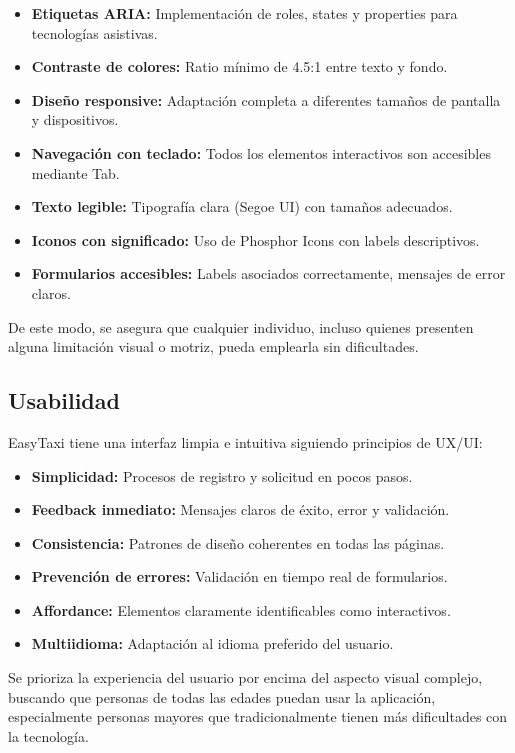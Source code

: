 \documentclass[12pt,a4paper]{article}
\begin{document}
\begin{itemize}
    \item \textbf{Etiquetas ARIA:} Implementación de roles, states y properties para tecnologías asistivas.
    \item \textbf{Contraste de colores:} Ratio mínimo de 4.5:1 entre texto y fondo.
    \item \textbf{Diseño responsive:} Adaptación completa a diferentes tamaños de pantalla y dispositivos.
    \item \textbf{Navegación con teclado:} Todos los elementos interactivos son accesibles mediante Tab.
    \item \textbf{Texto legible:} Tipografía clara (Segoe UI) con tamaños adecuados.
    \item \textbf{Iconos con significado:} Uso de Phosphor Icons con labels descriptivos.
    \item \textbf{Formularios accesibles:} Labels asociados correctamente, mensajes de error claros.
\end{itemize}

De este modo, se asegura que cualquier individuo, incluso quienes presenten alguna limitación visual o motriz, pueda emplearla sin dificultades.

\subsection{Usabilidad}

EasyTaxi tiene una interfaz limpia e intuitiva siguiendo principios de UX/UI:

\begin{itemize}
    \item \textbf{Simplicidad:} Procesos de registro y solicitud en pocos pasos.
    \item \textbf{Feedback inmediato:} Mensajes claros de éxito, error y validación.
    \item \textbf{Consistencia:} Patrones de diseño coherentes en todas las páginas.
    \item \textbf{Prevención de errores:} Validación en tiempo real de formularios.
    \item \textbf{Affordance:} Elementos claramente identificables como interactivos.
    \item \textbf{Multiidioma:} Adaptación al idioma preferido del usuario.
\end{itemize}

Se prioriza la experiencia del usuario por encima del aspecto visual complejo, buscando que personas de todas las edades puedan usar la aplicación, especialmente personas mayores que tradicionalmente tienen más dificultades con la tecnología.
\end{document}
